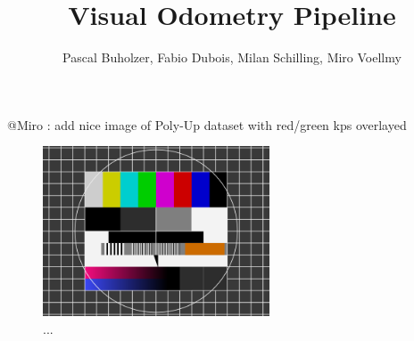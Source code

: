 \documentclass[a4paper,10pt]{article} %
\title{Visual Odometry Pipeline}
\author{Pascal Buholzer, Fabio Dubois, Milan Schilling, Miro Voellmy}
\begin{document}
\vspace*{3cm}
{\let\newpage\relax\maketitle}

@Miro : add nice image of Poly-Up dataset with red/green kps overlayed
\begin{figure}[ht]
	\centering
	\includegraphics[width=0.6\textwidth]{test}
	\caption{...}
	\label{img_title}
\end{figure}

\newpage

\newpage

\tableofcontents
\newpage

\newpage

\newpage

\newpage



\newpage
%
\end{document}
